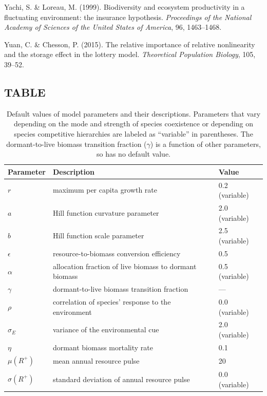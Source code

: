 \documentclass[12pt,]{article}
\begin{document}
\hypertarget{ref-Yachi1999}{}
Yachi, S. \& Loreau, M. (1999). Biodiversity and ecosystem productivity
in a fluctuating environment: the insurance hypothesis.
\emph{Proceedings of the National Academy of Sciences of the United
States of America}, 96, 1463--1468.

\hypertarget{ref-Yuan2015}{}
Yuan, C. \& Chesson, P. (2015). The relative importance of relative
nonlinearity and the storage effect in the lottery model.
\emph{Theoretical Population Biology}, 105, 39--52.

\newpage{}

\subsection{TABLE}\label{table}

\begin{table}[!htbp]
\caption{Default values of model parameters and their descriptions. Parameters that vary depending on the mode and strength of species coexistence or depending on species competitive hierarchies are labeled as ``variable'' in parentheses. The dormant-to-live biomass transition fraction ($\gamma$) is a function of other parameters, so has no default value.}
\begin{tabular}{l l l}
\hline
Parameter & Description & Value \\
\hline
$r$ & maximum per capita growth rate & 0.2 (variable) \\
$a$ & Hill function curvature parameter & 2.0 (variable) \\
$b$ & Hill function scale parameter & 2.5 (variable) \\
$\epsilon$ & resource-to-biomass conversion efficiency & 0.5 \\
$\alpha$ & allocation fraction of live biomass to dormant biomass & 0.5 (variable) \\
$\gamma$ & dormant-to-live biomass transition fraction & --- \\
$\rho$ & correlation of species' response to the environment & 0.0 (variable) \\
$\sigma_E$ & variance of the environmental cue & 2.0 (variable) \\
$\eta$ & dormant biomass mortality rate & 0.1 \\
$\mu(R^+)$ & mean annual resource pulse & 20 \\
$\sigma(R^+)$ & standard deviation of annual resource pulse & 0.0 (variable) \\
\hline
\end{tabular}
\end{table}
\end{document}
